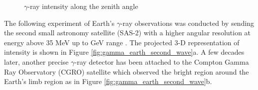 \begin{figure}[h!]
    \centering
        \hfill
        \caption{
            $\gamma$-ray intensity along the zenith angle
            \citep{kraushaar1965explorer}
        }
       \label{fig:explorer_xi_zenith}
\end{figure}

The following experiment of Earth's $\gamma$-ray observations was conducted 
by sending the second small astronomy satellite (SAS-2) with
a higher angular resolution at energy
above 35 MeV up to GeV range
\citep{Thompson81}. The projected 3-D representation of intensity
is shown in Figure \ref{fig:gamma_earth_second_wave}a. A few decades 
later, another precise $\gamma$-ray detector has been attached to the 
Compton Gamma Ray Observatory (CGRO) satellite \citep{Petry05}
which observed
the bright region around the Earth's limb region as 
in Figure \ref{fig:gamma_earth_second_wave}b.


